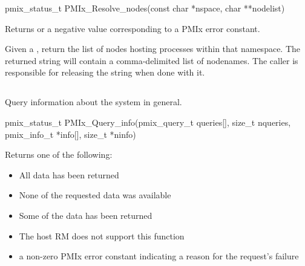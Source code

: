 \cspecificstart
\begin{codepar}
pmix_status_t
PMIx_Resolve_nodes(const char *nspace, char **nodelist)
\end{codepar}
\cspecificend

\begin{arglist}
\end{arglist}

Returns  or a negative value corresponding to a PMIx error constant.

\descr

Given a , return the list of nodes hosting processes within that namespace.
The returned string will contain a comma-delimited list of nodenames.
The caller is responsible for releasing the string when done with it.


\subsection{}

\summary

Query information about the system in general.

\format

\cspecificstart
\begin{codepar}
pmix_status_t
PMIx_Query_info(pmix_query_t queries[], size_t nqueries,
                pmix_info_t *info[], size_t *ninfo)
\end{codepar}
\cspecificend

\begin{arglist}
\end{arglist}

Returns one of the following:

\begin{itemize}
\item {} All data has been returned
\item {} None of the requested data was available
\item {} Some of the data has been returned
\item {} The host \ac{RM} does not support this function
\item a non-zero \ac{PMIx} error constant indicating a reason for the request's failure
\end{itemize}

